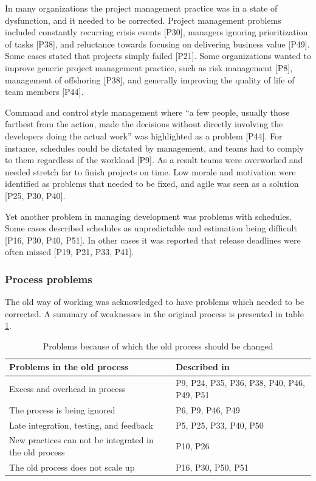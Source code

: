 \documentclass[preprint,authoryear,12pt]{elsarticle}
\begin{document}
In many organizations the project management practice was in a state of
dysfunction, and it needed to be corrected. Project management problems included
constantly recurring crisis events [P30], managers ignoring prioritization of
tasks [P38], and reluctance towards focusing on delivering business value [P49].
Some cases stated that projects simply failed [P21]. Some organizations wanted
to improve generic project management practice, such as risk management [P8],
management of offshoring [P38], and generally improving the quality of life of
team members [P44].

Command and control style management where ``a few people, usually those
farthest from the action, made the decisions without directly involving the
developers doing the actual work'' was highlighted as a problem [P44]. For
instance, schedules could be dictated by management, and teams had to comply to
them regardless of the workload [P9]. As a result teams were overworked and
needed stretch far to finish projects on time. Low morale and motivation were
identified as problems that needed to be fixed, and agile was seen as a solution
[P25, P30, P40].

Yet another problem in managing development was problems with schedules.
Some cases described schedules as unpredictable and estimation being difficult
[P16, P30, P40, P51]. In other cases it was reported that release deadlines were
often missed [P19, P21, P33, P41].

\subsubsection{Process problems}

The old way of working was acknowledged to have problems which needed to be
corrected. A summary of weaknesses in the original process is presented in table
\ref{table:reasonstochange_process}.

\begin{table}[b]
    \centering
    \begin{tabular}{ >{\raggedright\arraybackslash}p{}
                     >{\raggedright\arraybackslash}p{} }
        Problems in the old process           &  Described in  \\
        \midrule
        Excess and overhead in process     &  P9, P24, P35, P36, P38, P40, P46, P49, P51  \\
        The process is being ignored       &  P6, P9, P46, P49  \\
        Late integration, testing, and feedback  &  P5, P25, P33, P40, P50  \\
        New practices can not be integrated in the old process  &  P10, P26  \\
        The old process does not scale up  &  P16, P30, P50, P51  \\
        \bottomrule
    \end{tabular}
    \caption{Problems because of which the old process should be changed}
    \label{table:reasonstochange_process}
\end{table}
\end{document}
